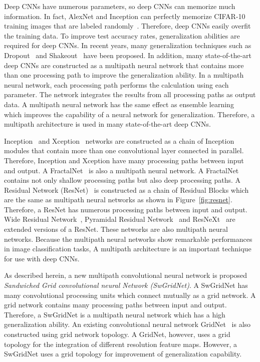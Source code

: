 \documentclass[10pt,twocolumn,letterpaper]{article}
\begin{document}
Deep CNNs have numerous parameters, so deep CNNs can memorize much information.
In fact, AlexNet and Inception can perfectly memorize CIFAR-10 training images that are labeled randomly~\cite{UnderstandingDeepLearning}.
Therefore, deep CNNs easily overfit the training data.
To improve test accuracy rates, generalization abilities are required for deep CNNs.
In recent years, many generalization techniques such as Dropout~\cite{Dropout} and Shakeout~\cite{Shakeout} have been proposed.
In addition, many state-of-the-art deep CNNs are constructed as a multipath neural network
that contains more than one processing path to improve the generalization ability.
In a multipath neural network, each processing path performs the calculation using each parameter.
The network integrates the results from all processing paths as output data.
A multipath neural network has the same effect as ensemble learning~\cite{EnsembleLearning} which improves the capability of a neural network for generalization.
Therefore, a multipath architecture is used in many state-of-the-art deep CNNs.

Inception~\cite{Inception} and Xception~\cite{Xception} networks are constructed as a chain of Inception modules
that contain more than one convolutional layer connected in parallel.
Therefore, Inception and Xception have many processing paths between input and output.
A FractalNet~\cite{FractalNet} is also a multipath neural network.
A FractalNet contains not only shallow processing paths but also deep processing paths.
A Residual Network (ResNet)~\cite{ResNet} is constructed as a chain of Residual Blocks
which are the same as multipath neural networks as shown in Figure~\ref{fig:resnet}.
Therefore, a ResNet has numerous processing paths between input and output.
Wide Residual Network~\cite{WideResNet}, Pyramidal Residual Network~\cite{PyramidalResNet} and ResNeXt~\cite{ResNeXt} are
extended versions of a ResNet. These networks are also multipath neural networks.
Because the multipath neural networks show remarkable performances in image classification tasks,
A multipath architecture is an important technique for use with deep CNNs.

As described herein, a new multipath convolutional neural network is proposed {\it Sandwiched Grid convolutional neural Network (SwGridNet)}.
A SwGridNet has many convolutional processing units which connect mutually as a grid network.
A grid network contains many processing paths between input and output.
Therefore, a SwGridNet is a multipath neural network which has a high generalization ability.
An existing convolutional neural network GridNet~\cite{GridNet} is also constructed using grid network topology.
A GridNet, however, uses a grid topology for the integration of different resolution feature maps.
However, a SwGridNet uses a grid topology for improvement of generalization capability.
\end{document}
